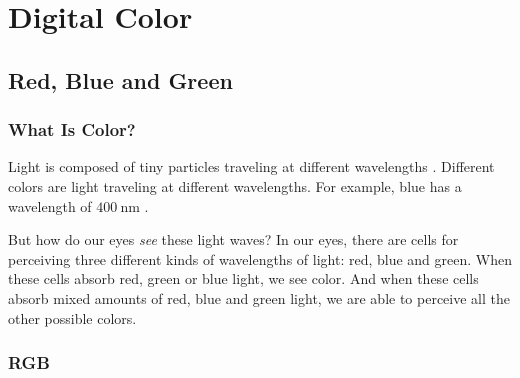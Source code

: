 \begin{comment}
  
\end{comment}

\chapter{Digital Color}
\label{cha:color}

\cite{niederst1999webdesign}






\cite{Cotton95colour}

\section{Red, Blue and Green}
\label{sec:color-models}

\subsection{What Is Color?}
\label{sec:what-color}

\newcommand{\bluewave}{\ensuremath{\SI{400}{\nano\meter}}}

Light is composed of tiny particles traveling at different
wavelengths \cite{neider93:_openg_progr_guide}.
Different colors are light traveling at different wavelengths. For
example, blue has a wavelength of \bluewave
\cite{ohlsson99:_digit_bild_kreat}.

But how do our eyes \textit{see} these light waves? In our eyes,
there are cells for perceiving three different kinds of wavelengths
of light: red, blue and green. When these cells absorb red, green or
blue light, we see color. And when these cells absorb mixed amounts
of red, blue and green light, we are able to perceive all the other
possible colors.

\subsection{RGB}
\label{sec:rgb}

